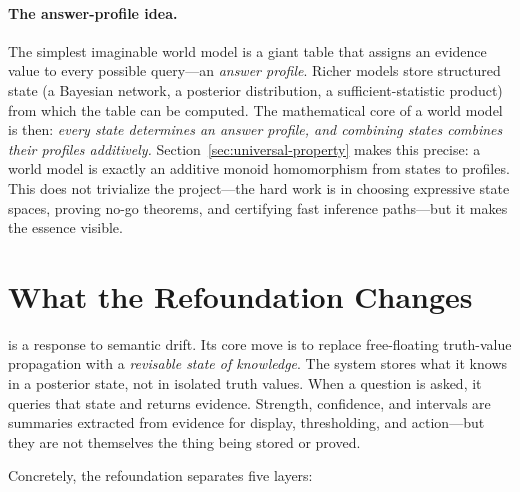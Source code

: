 \documentclass[11pt,openany]{report}
\begin{document}
\paragraph{The answer-profile idea.}
The simplest imaginable world model is a giant table that assigns an
evidence value to every possible query---an \emph{answer profile}.
Richer models store structured state (a Bayesian network, a posterior
distribution, a sufficient-statistic product) from which the table can
be computed.  The mathematical core of a world model is then:
\emph{every state determines an answer profile, and combining states
combines their profiles additively.}  Section~\ref{sec:universal-property}
makes this precise: a world model is exactly an additive monoid
homomorphism from states to profiles.  This does not trivialize the
project---the hard work is in choosing expressive state spaces, proving
no-go theorems, and certifying fast inference paths---but it makes the
essence visible.

\section{What the Refoundation Changes}

\xiPLN{} is a response to semantic drift.  Its core move is to replace
free-floating truth-value propagation with a \emph{revisable state of
knowledge}.  The system stores what it knows in a posterior state, not
in isolated truth values.  When a question is asked, it queries that
state and returns evidence.  Strength, confidence, and intervals are
summaries extracted from evidence for display, thresholding, and
action---but they are not themselves the thing being stored or proved.

Concretely, the refoundation separates five layers:
\end{document}
